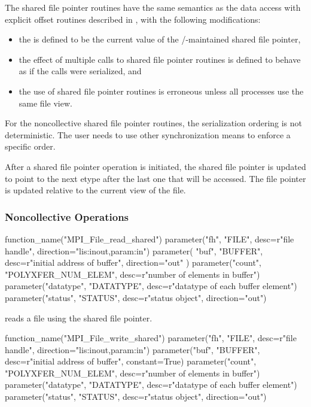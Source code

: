 The shared file pointer routines
have the same semantics as the data access with explicit offset routines
described in ,
with the following modifications:
\begin{itemize}
\item the  is defined to be the current value
        of the \MPI/-maintained shared file pointer,
\item the effect of multiple calls to shared file pointer routines
        is defined to behave as if the calls were serialized, and
\item the use of shared file pointer routines is erroneous unless
        all processes use the same file view.
\end{itemize}
For the noncollective shared file pointer routines,
the
serialization ordering is not deterministic.
The user needs to use other synchronization means
to enforce a specific order.

After a shared file pointer operation is initiated,
the shared file pointer is updated to point to the next
etype after the last one 
that will be accessed.
The file pointer is updated relative to the current view of the file.


\subsubsection{Noncollective Operations}
\label{sec:io-shared-ptr-ind}

%
%
\begin{mpi-binding}
    function_name("MPI_File_read_shared")
    parameter("fh", "FILE", desc=r"file handle", direction="lis:inout,param:in")
    parameter(
        "buf", "BUFFER", desc=r"initial address of buffer", direction="out"
    )
    parameter("count", "POLYXFER_NUM_ELEM", desc=r"number of elements in buffer")
    parameter("datatype", "DATATYPE", desc=r"datatype of each buffer element")
    parameter("status", "STATUS", desc=r"status object", direction="out")
\end{mpi-binding}

 reads a file
using the shared file pointer.

%
%
\begin{mpi-binding}
    function_name("MPI_File_write_shared")
    parameter("fh", "FILE", desc=r"file handle", direction="lis:inout,param:in")
    parameter("buf", "BUFFER", desc=r"initial address of buffer", constant=True)
    parameter("count", "POLYXFER_NUM_ELEM", desc=r"number of elements in buffer")
    parameter("datatype", "DATATYPE", desc=r"datatype of each buffer element")
    parameter("status", "STATUS", desc=r"status object", direction="out")
\end{mpi-binding}

